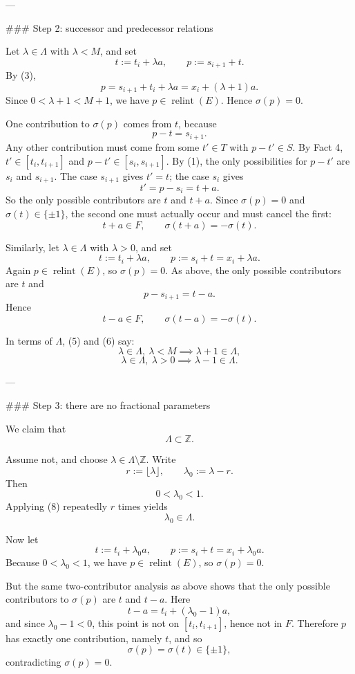 ---

### Step 2: successor and predecessor relations

Let \(\lambda\in\Lambda\) with \(\lambda<M\), and set
\[
t:=t_i+\lambda a,\qquad p:=s_{i+1}+t.
\]
By (3),
\[
p=s_{i+1}+t_i+\lambda a=x_i+(\lambda+1)a.
\]
Since \(0<\lambda+1<M+1\), we have \(p\in\operatorname{relint}(E)\). Hence \(\sigma(p)=0\).

One contribution to \(\sigma(p)\) comes from \(t\), because
\[
p-t=s_{i+1}.
\]
Any other contribution must come from some \(t'\in T\) with \(p-t'\in S\). By Fact 4, \(t'\in[t_i,t_{i+1}]\) and \(p-t'\in[s_i,s_{i+1}]\). By (1), the only possibilities for \(p-t'\) are \(s_i\) and \(s_{i+1}\). The case \(s_{i+1}\) gives \(t'=t\); the case \(s_i\) gives
\[
t'=p-s_i=t+a.
\]
So the only possible contributors are \(t\) and \(t+a\). Since \(\sigma(p)=0\) and \(\sigma(t)\in\{\pm1\}\), the second one must actually occur and must cancel the first:
\[
t+a\in F,\qquad \sigma(t+a)=-\sigma(t).
\tag{5}
\]

Similarly, let \(\lambda\in\Lambda\) with \(\lambda>0\), and set
\[
t:=t_i+\lambda a,\qquad p:=s_i+t=x_i+\lambda a.
\]
Again \(p\in\operatorname{relint}(E)\), so \(\sigma(p)=0\). As above, the only possible contributors are \(t\) and
\[
p-s_{i+1}=t-a.
\]
Hence
\[
t-a\in F,\qquad \sigma(t-a)=-\sigma(t).
\tag{6}
\]

In terms of \(\Lambda\), (5) and (6) say:
\[
\lambda\in\Lambda,\ \lambda<M \implies \lambda+1\in\Lambda,
\tag{7}
\]
\[
\lambda\in\Lambda,\ \lambda>0 \implies \lambda-1\in\Lambda.
\tag{8}
\]

---

### Step 3: there are no fractional parameters

We claim that
\[
\Lambda\subset\mathbb{Z}.
\]

Assume not, and choose \(\lambda\in\Lambda\setminus\mathbb{Z}\). Write
\[
r:=\lfloor\lambda\rfloor,\qquad \lambda_0:=\lambda-r.
\]
Then
\[
0<\lambda_0<1.
\]
Applying (8) repeatedly \(r\) times yields
\[
\lambda_0\in\Lambda.
\]

Now let
\[
t:=t_i+\lambda_0 a,\qquad p:=s_i+t=x_i+\lambda_0 a.
\]
Because \(0<\lambda_0<1\), we have \(p\in\operatorname{relint}(E)\), so \(\sigma(p)=0\).

But the same two-contributor analysis as above shows that the only possible contributors to \(\sigma(p)\) are \(t\) and \(t-a\). Here
\[
t-a=t_i+(\lambda_0-1)a,
\]
and since \(\lambda_0-1<0\), this point is not on \([t_i,t_{i+1}]\), hence not in \(F\). Therefore \(p\) has exactly one contribution, namely \(t\), and so
\[
\sigma(p)=\sigma(t)\in\{\pm1\},
\]
contradicting \(\sigma(p)=0\).

